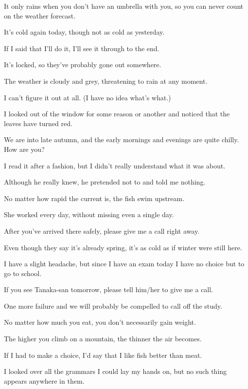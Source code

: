 \ifVOLONE
\item[1.] It only rains when you don't have an umbrella with you, so you can never count on the weather forecast.
\item[2.] It's cold again today, though not as cold as yesterday.
\item[3.] If I said that I'll do it, I'll see it through to the end.
\item[4.] It's locked, so they've probably gone out somewhere.
\item[5.] The weather is cloudy and grey, threatening to rain at any moment.
\item[6.] I can't figure it out at all. (I have no idea what's what.)
\item[7.] I looked out of the window for some reason or another and noticed that the leaves have turned red.
\item[8.] We are into late autumn, and the early mornings and evenings are quite chilly. How are you?
\item[9.] I read it after a fashion, but I didn't really understand what it was about.
\item[10.] Although he really knew, he pretended not to and told me nothing.
\item[11.] No matter how rapid the current is, the fish swim upstream.
\item[12.] She worked every day, without missing even a single day.
\item[13.] After you've arrived there safely, please give me a call right away.
\item[14.] Even though they say it's already spring, it's as cold as if winter were still here.
\item[15.] I have a slight headache, but since I have an exam today I have no choice but to go to school.
\item[16.] If you see Tanaka-san tomorrow, please tell him/her to give me a call.
\item[17.] One more failure and we will probably be compelled to call off the study.
\item[18.] No matter how much you eat, you don't necessarily gain weight.
\item[19.] The higher you climb on a mountain, the thinner the air becomes.
\item[20.] If I had to make a choice, I'd say that I like fish better than meat.
\item[21.] I looked over all the grammars I could lay my hands on, but no such thing appears anywhere in them.
